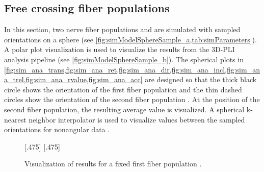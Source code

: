 \subsection{Free crossing fiber populations}
\label{sec:resFreeCross}
%
In this section, two nerve fiber populations \popa{} and \popb{} are simulated with sampled orientations on a sphere (see \cref{fig:simModelSphereSample_a,tab:simParameters}).
A polar plot visualization is used to visualize the results from the \ac{3D-PLI} analysis pipeline (see \cref{fig:simModelSphereSample_b}).
The spherical plots in \cref{fig:sim_ana_trans,fig:sim_ana_ret,fig:sim_ana_dir,fig:sim_ana_incl,fig:sim_ana_trel,fig:sim_ana_rvalue,fig:sim_ana_acc}
are designed so that the thick black circle shows the orientation of the first fiber population \popa{} and the thin dashed circles show the orientation of the second fiber population \popb{}.
At the position of the second fiber population, the resulting average value is visualized.
A spherical k-nearest neighbor interpolator is used to visualize values between the sampled orientations for nonangular data \cite{DBLP:journals/corr/abs-1910-00704}.
\par
%
\begin{figure}[!t]
\centering
\setlength{\tikzwidth}{0.40\textwidth}
[.475\textwidth]{}
\hfill
{}
[.475\textwidth]{}
\caption[]{Visualization of results for a fixed first fiber population \popa{}.}
\label{fig:simModelSphereSample}
\end{figure}
%
%
%

